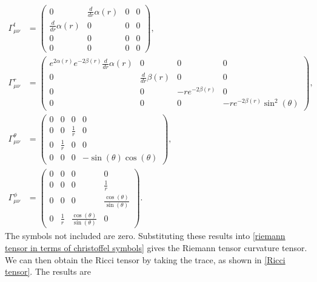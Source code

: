 \begin{align}
    \Gamma^t_{\mu \nu}
    & =
    \left(
        \begin{matrix}
            0 & \frac{d}{d r} \alpha{\left(r \right)} & 0 & 0\\\frac{d}{d r} \alpha{\left(r \right)} & 0 & 0 & 0\\0 & 0 & 0 & 0\\0 & 0 & 0 & 0
        \end{matrix}
    \right), \\
    \Gamma^r_{\mu \nu}
    &=
    \left(
        \begin{matrix}
            e^{2 \alpha{\left(r \right)}} e^{- 2 \beta{\left(r \right)}} \frac{d}{d r} \alpha{\left(r \right)} & 0 & 0 & 0\\0 & \frac{d}{d r} \beta{\left(r \right)} & 0 & 0\\0 & 0 & - r e^{- 2 \beta{\left(r \right)}} & 0\\0 & 0 & 0 & - r e^{- 2 \beta{\left(r \right)}} \sin^{2}{\left(\theta \right)}
        \end{matrix}
     \right), \\
     \Gamma^\theta_{\mu \nu} 
     & =
     \left(
         \begin{matrix}
            0 & 0 & 0 & 0\\0 & 0 & \frac{1}{r} & 0\\0 & \frac{1}{r} & 0 & 0\\0 & 0 & 0 & - \sin{\left(\theta \right)} \cos{\left(\theta \right)}
        \end{matrix}
    \right), \\
    \Gamma^\phi_{\mu \nu} 
    &=
    \left(
        \begin{matrix}
            0 & 0 & 0 & 0\\0 & 0 & 0 & \frac{1}{r}\\0 & 0 & 0 & \frac{\cos{\left(\theta \right)}}{\sin{\left(\theta \right)}}\\0 & \frac{1}{r} & \frac{\cos{\left(\theta \right)}}{\sin{\left(\theta \right)}} & 0
        \end{matrix}
    \right).
\end{align}
%
The symbols not included are zero.
Substituting these results into \autoref{riemann tensor in terms of christoffel symbols} gives the Riemann tensor curvature tensor.
We can then obtain the Ricci tensor by taking the trace, as shown in \autoref{Ricci tensor}.
The results are
%
